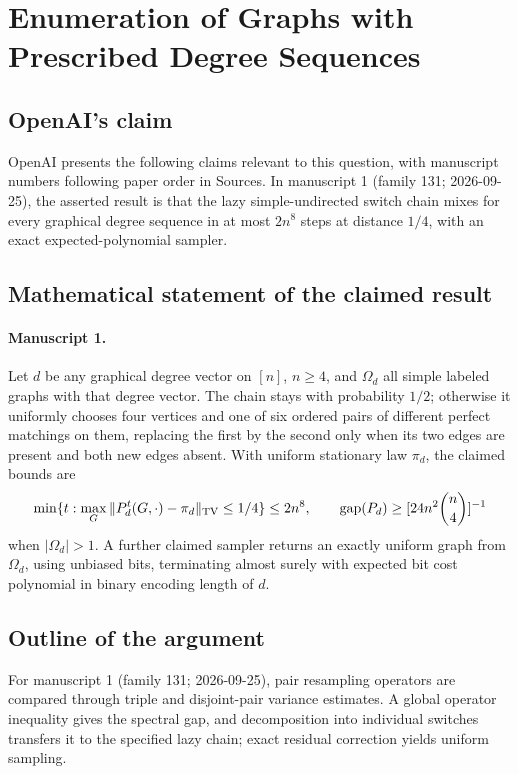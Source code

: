 \documentclass[11pt]{article}
\begin{document}
\section*{Enumeration of Graphs with Prescribed Degree Sequences}

\subsection{OpenAI's claim}
OpenAI presents the following claims relevant to this question, with manuscript numbers following paper order in Sources. In manuscript 1 (family 131; 2026-09-25), the asserted result is that the lazy simple-undirected switch chain mixes for every graphical degree sequence in at most $2n^8$ steps at distance $1/4$, with an exact expected-polynomial sampler.

\subsection{Mathematical statement of the claimed result}
\paragraph{Manuscript 1.}
Let $d$ be any graphical degree vector on $[n]$, $n\ge4$, and $\Omega_d$ all simple labeled graphs with that degree vector. The chain stays with probability $1/2$; otherwise it uniformly chooses four vertices and one of six ordered pairs of different perfect matchings on them, replacing the first by the second only when its two edges are present and both new edges absent. With uniform stationary law $\pi_d$, the claimed bounds are
\[
 \min\{t:\max_G\|P_d^t(G,\cdot)-\pi_d\|_{\rm TV}\le1/4\}\le2n^8,
 \qquad\operatorname{gap}(P_d)\ge[24n^2\binom n4]^{-1}
\]
when $|\Omega_d|>1$. A further claimed sampler returns an exactly uniform graph from $\Omega_d$, using unbiased bits, terminating almost surely with expected bit cost polynomial in binary encoding length of $d$.

\subsection{Outline of the argument}
For manuscript 1 (family 131; 2026-09-25), pair resampling operators are compared through triple and disjoint-pair variance estimates. A global operator inequality gives the spectral gap, and decomposition into individual switches transfers it to the specified lazy chain; exact residual correction yields uniform sampling.
\end{document}
